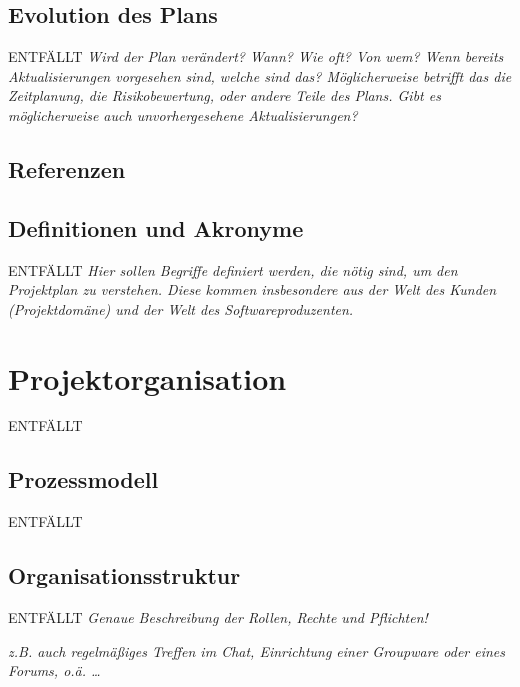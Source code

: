 \documentclass[fontsize=12pt,paper=a4,twoside]{scrartcl}
\begin{document}
\subsection{Evolution des Plans}
ENTFÄLLT
{\em Wird der Plan verändert? Wann? Wie oft? Von wem? Wenn bereits Aktualisierungen vorgesehen sind, welche sind das? Möglicherweise betrifft das die Zeitplanung, die Risikobewertung, oder andere Teile des Plans. Gibt es möglicherweise auch unvorhergesehene Aktualisierungen?}

\subsection{Referenzen}
%
%
%
%

{\renewcommand\section[2]{}

}

\subsection{Definitionen und Akronyme}
ENTFÄLLT
{\em Hier sollen Begriffe definiert werden, die nötig sind, um den
  Projektplan zu verstehen. Diese kommen insbesondere aus der Welt des
  Kunden (Projektdomäne) und der Welt des Softwareproduzenten.}

\section{Projektorganisation}
ENTFÄLLT
\subsection{Prozessmodell}
ENTFÄLLT
\subsection{Organisationsstruktur}
ENTFÄLLT
{\em Genaue Beschreibung der Rollen, Rechte und Pflichten!}

{\em z.B. auch regelmäßiges Treffen im Chat, Einrichtung einer
  Groupware oder eines Forums, o.ä. \dots}
\end{document}

